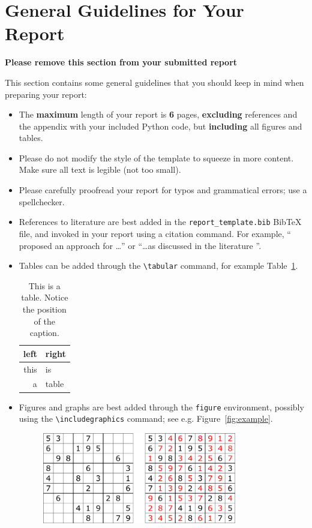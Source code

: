 \documentclass[11pt]{article}
\begin{document}
\section*{General Guidelines for Your Report}
\textbf{Please remove this section from your submitted report}

This section contains some general guidelines that you should keep in mind when preparing your report:
\begin{itemize}
	\item
		The \textbf{maximum} length of your report is \textbf{6} pages, \textbf{excluding} references and the appendix with your included Python code, but \textbf{including} all figures and tables.
	\item
		Please do not modify the style of the template to squeeze in more content. Make sure all text is legible (not too small).
	\item
		Please carefully proofread your report for typos and grammatical errors; use a spellchecker.
	\item
		References to literature are best added in the \texttt{report\_template.bib} BibTeX file, and invoked in your report using a citation command. For example, “\citet{shannon1950xxii} proposed an approach for \dots” or “\dots as discussed in the literature \citep{shannon1950xxii}”.
	\item
		Tables can be added through the \texttt{{\textbackslash}tabular} command, for example Table~\ref{tab:a_table}.
		\begin{table}
			\centering
			\caption{This is a table. Notice the position of the caption.}\label{tab:a_table}
			\begin{tabular}{rl}
				\toprule
				\textbf{left} & \textbf{right}\\
				\midrule
				this & is \\
				a & table\\
				\bottomrule
			\end{tabular}
		\end{table}
	\item
		Figures and graphs are best added through the \texttt{figure} environment, possibly using the \texttt{{\textbackslash}includegraphics} command; see e.g. Figure~\ref{fig:example}.
		\begin{figure}
			\centering
			\includegraphics[width=0.8\textwidth]{img/sudokuexample}

\end{figure}
\end{itemize}
\end{document}
